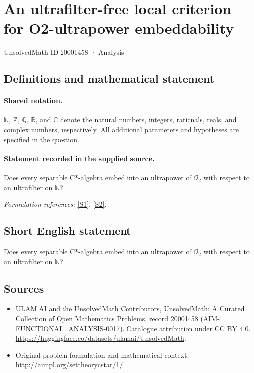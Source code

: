 \documentclass[11pt]{article}
\newcommand{\sref}[2]{\hyperlink{source:#1:#2}{[S#2]}}
\begin{document}
\setcounter{section}{20001457}
\section{An ultrafilter-free local criterion for O2-ultrapower embeddability}\label{20001458}
{\small UnsolvedMath ID 20001458 · Analysis}
\subsection{Definitions and mathematical statement}

\paragraph{Shared notation.}$\mathbb N$, $\mathbb Z$, $\mathbb Q$, $\mathbb R$, and $\mathbb C$ denote the natural numbers, integers, rationals, reals, and complex numbers, respectively. All additional parameters and hypotheses are specified in the question.


\paragraph{Statement recorded in the supplied source.}
Does every separable C*-algebra embed into an ultrapower of
$\mathcal O_2$ with respect to an ultrafilter on $\mathbb N$?
\par\smallskip\textit{Formulation references:} \sref{20001458}{1}, \sref{20001458}{2}.
\subsection{Short English statement}
Does every separable C*-algebra embed into an ultrapower of
$\mathcal O_2$ with respect to an ultrafilter on $\mathbb N$?
\subsection{Sources}
\begin{itemize}
\item[\hypertarget{source:20001458:1}{S1}] ULAM.AI and the UnsolvedMath Contributors, UnsolvedMath: A Curated Collection of Open Mathematics Problems, record 20001458 (AIM-FUNCTIONAL\_ANALYSIS-0017). Catalogue attribution under CC BY 4.0.
\url{https://huggingface.co/datasets/ulamai/UnsolvedMath}.
\item[\hypertarget{source:20001458:2}{S2}] Original problem formulation and mathematical context.
\url{http://aimpl.org/settheorycstar/1/}.
\end{itemize}
\label{end:20001458}
\end{document}
